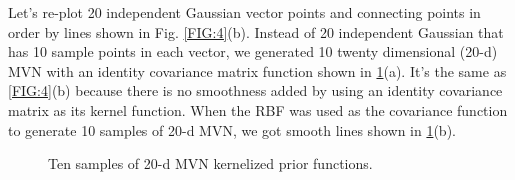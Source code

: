 \documentclass[12pt,letterpaper,fleqn,oneside,titlepage]{offroad-report}
\begin{document}
Let's re-plot 20 independent Gaussian vector points and connecting points in order by lines shown in Fig. \ref{FIG:4}(b). Instead of 20 independent Gaussian that has 10 sample points in each vector, we generated 10 twenty dimensional (20-d) MVN with an identity covariance matrix function shown in \ref{FIG:7}(a). It's the same as \ref{FIG:4}(b) because there is no smoothness added by using an identity covariance matrix as its kernel function. When the RBF was used as the covariance function to generate 10 samples of 20-d MVN, we got smooth lines shown in \ref{FIG:7}(b).
\begin{figure}[h!]
    \centering
    \qquad
    \caption{Ten samples of 20-d MVN kernelized prior functions.}%
    \label{FIG:7}
\end{figure}
\end{document}
